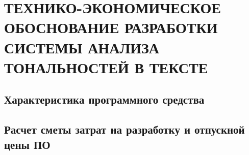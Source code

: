 \section{ТЕХНИКО-ЭКОНОМИЧЕСКОЕ ОБОСНОВАНИЕ РАЗРАБОТКИ СИСТЕМЫ АНАЛИЗА ТОНАЛЬНОСТЕЙ В ТЕКСТЕ}
\subsection{Характеристика программного средства}
\subsection{Расчет сметы затрат на разработку и отпускной цены ПО}
